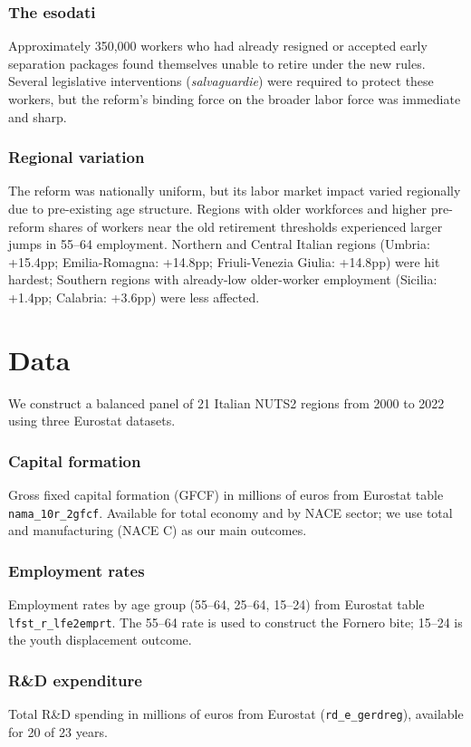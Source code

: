 \documentclass[12pt]{article}
\begin{document}
\subsubsection*{The esodati} Approximately 350,000 workers who had already resigned or accepted early separation packages found themselves unable to retire under the new rules. Several legislative interventions (\textit{salvaguardie}) were required to protect these workers, but the reform's binding force on the broader labor force was immediate and sharp.

\subsubsection*{Regional variation} The reform was nationally uniform, but its labor market impact varied regionally due to pre-existing age structure. Regions with older workforces and higher pre-reform shares of workers near the old retirement thresholds experienced larger jumps in 55--64 employment. Northern and Central Italian regions (Umbria: +15.4pp; Emilia-Romagna: +14.8pp; Friuli-Venezia Giulia: +14.8pp) were hit hardest; Southern regions with already-low older-worker employment (Sicilia: +1.4pp; Calabria: +3.6pp) were less affected.


\section{Data}

We construct a balanced panel of 21 Italian NUTS2 regions from 2000 to 2022 using three Eurostat datasets.

\subsubsection*{Capital formation} Gross fixed capital formation (GFCF) in millions of euros from Eurostat table \texttt{nama\_10r\_2gfcf}. Available for total economy and by NACE sector; we use total and manufacturing (NACE C) as our main outcomes.

\subsubsection*{Employment rates} Employment rates by age group (55--64, 25--64, 15--24) from Eurostat table \texttt{lfst\_r\_lfe2emprt}. The 55--64 rate is used to construct the Fornero bite; 15--24 is the youth displacement outcome.

\subsubsection*{R\&D expenditure} Total R\&D spending in millions of euros from Eurostat (\texttt{rd\_e\_gerdreg}), available for 20 of 23 years.
\end{document}
